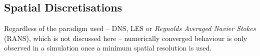 \subsection{Spatial Discretisations} \label{sec:high-order}

Regardless of the paradigm used -- DNS, LES or \emph{Reynolds Averaged Navier Stokes} (RANS), which is not discussed here -- numerically converged behaviour is only observed in a simulation once a minimum spatial resolution is used.








